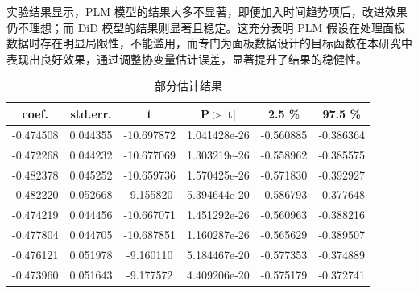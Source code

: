 \documentclass[a4paper,12pt]{article}
\begin{document}
\begin{table}[H]
\renewcommand{\arraystretch}{0.8}
\centering
{}
\caption{平均处理效应}
\end{table}

实验结果显示，PLM 模型的结果大多不显著，即便加入时间趋势项后，改进效果仍不理想；而 DiD 模型的结果则显著且稳定。这充分表明 PLM 假设在处理面板数据时存在明显局限性，不能滥用，而专门为面板数据设计的目标函数在本研究中表现出良好效果，通过调整协变量估计误差，显著提升了结果的稳健性。

\begin{table}[H]
 \centering
 \begin{tabular}{@{}cccccc@{}}
  \toprule
  \textbf{coef.} & \textbf{std.err.} & \textbf{t} & \textbf{P$> |$t$|$} & \textbf{2.5 \%} & \textbf{97.5 \%} \\ \midrule
  -0.474508 & 0.044355 & -10.697872 & 1.041428e-26 & -0.560885 & -0.386364 \\
  -0.472268 & 0.044232 & -10.677069 & 1.303219e-26 & -0.558962 & -0.385575 \\
  -0.482378 & 0.045252 & -10.659736 & 1.570425e-26 & -0.571830 & -0.392927 \\
  -0.482220 & 0.052668 & -9.155820  & 5.394644e-20 & -0.586793 & -0.377648 \\
  -0.474219 & 0.044456 & -10.667071 & 1.451292e-26 & -0.560963 & -0.388216 \\
  -0.477804 & 0.044705 & -10.687851 & 1.160287e-26 & -0.565629 & -0.389507 \\
  -0.476121 & 0.051978 & -9.160110  & 5.184467e-20 & -0.577353 & -0.374889 \\
  -0.473960 & 0.051643 & -9.177572  & 4.409206e-20 & -0.575179 & -0.372741 \\
  \bottomrule
 \end{tabular}
 \caption{部分估计结果}
\end{table}
\end{document}

